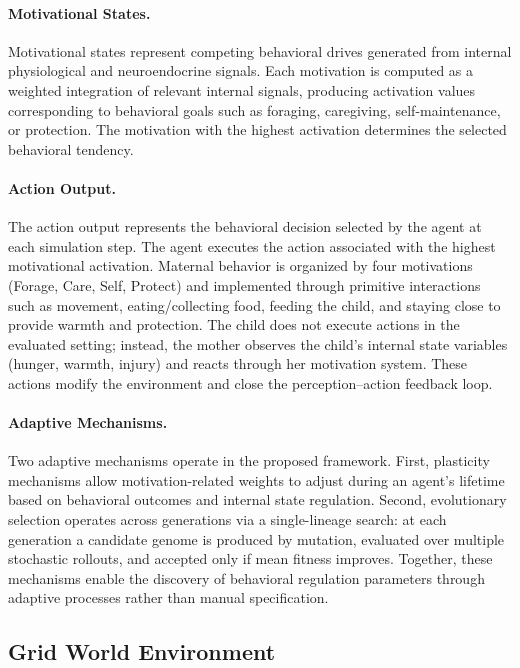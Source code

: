 \paragraph{Motivational States.}
Motivational states represent competing behavioral drives generated from internal physiological and neuroendocrine signals. Each motivation is computed as a weighted integration of relevant internal signals, producing activation values corresponding to behavioral goals such as foraging, caregiving, self-maintenance, or protection. The motivation with the highest activation determines the selected behavioral tendency.




\paragraph{Action Output.}
The action output represents the behavioral decision selected by the agent at each simulation step. The agent executes the action associated with the highest motivational activation. Maternal behavior is organized by four motivations (Forage, Care, Self, Protect) and implemented through primitive interactions such as movement, eating/collecting food, feeding the child, and staying close to provide warmth and protection. The child does not execute actions in the evaluated setting; instead, the mother observes the child's internal state variables (hunger, warmth, injury) and reacts through her motivation system. These actions modify the environment and close the perception–action feedback loop.


\paragraph{Adaptive Mechanisms.}
Two adaptive mechanisms operate in the proposed framework. First, plasticity mechanisms allow motivation-related weights to adjust during an agent's lifetime based on behavioral outcomes and internal state regulation. Second, evolutionary selection operates across generations via a single-lineage search: at each generation a candidate genome is produced by mutation, evaluated over multiple stochastic rollouts, and accepted only if mean fitness improves. Together, these mechanisms enable the discovery of behavioral regulation parameters through adaptive processes rather than manual specification.


\subsection{Grid World Environment}

